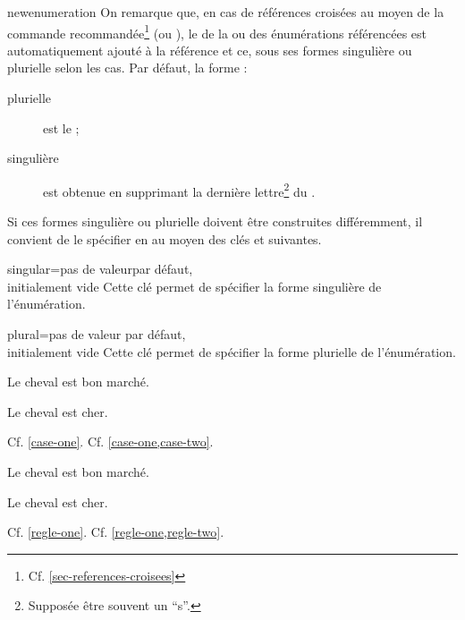\documentclass[french,nolocaltoc]{nwejmart}
\newtheorem[style=definition]{fait}
\newtheorem[title=expérience]{experience}
\newtheorem[title-plural=anneaux]{anneau}
\newtheorem[title=idéal,title-plural=idéaux]{ideal}
\begin{document}
\begin{docCommand}[doc new=2019-03-18]{newenumeration}{}
On remarque que, en cas de références croisées au moyen de la commande
recommandée\footnote{Cf. \vref{sec-references-croisees}}  (ou
), le  de la ou des énumérations référencées est
automatiquement ajouté à la référence et ce, sous ses formes singulière ou
plurielle selon les cas. Par défaut, la forme :
\begin{description}
\item[plurielle] est le  ;
\item[singulière] est obtenue en supprimant la dernière lettre\footnote{Supposée être
  souvent un \enquote{s}.} du .
\end{description}
Si ces formes singulière ou plurielle doivent être construites différemment, il
convient de le spécifier en  au moyen des clés
 et  suivantes.
  \begin{docKey}{singular}{={}}{pas de
      valeurpar défaut,\\initialement vide}
    Cette clé permet de spécifier la forme singulière de l'énumération.
  \end{docKey}
  \begin{docKey}{plural}{={}}{pas de
      valeur par défaut,\\initialement vide}
    Cette clé permet de spécifier la forme plurielle de l'énumération.
  \end{docKey}
\begin{preamblecode}
\end{preamblecode}
\begin{bodycode}[listing and text,listing options={deletekeywords={[2]label}}]
\begin{cas}
\item\label{case-one} Le cheval est bon marché.
\item\label{case-two} Le cheval est cher.
\end{cas}
Cf. \vref{case-one}. Cf. \vref{case-one,case-two}.
\end{bodycode}

\begin{preamblecode}
\end{preamblecode}
\begin{bodycode}[listing and text,listing options={deletekeywords={[2]label}}]
\begin{regles}
\item\label{regle-one} Le cheval est bon marché.
\item\label{regle-two} Le cheval est cher.
\end{regles}
Cf. \vref{regle-one}. Cf. \vref{regle-one,regle-two}.
\end{bodycode}
%
\end{docCommand}
\end{document}
